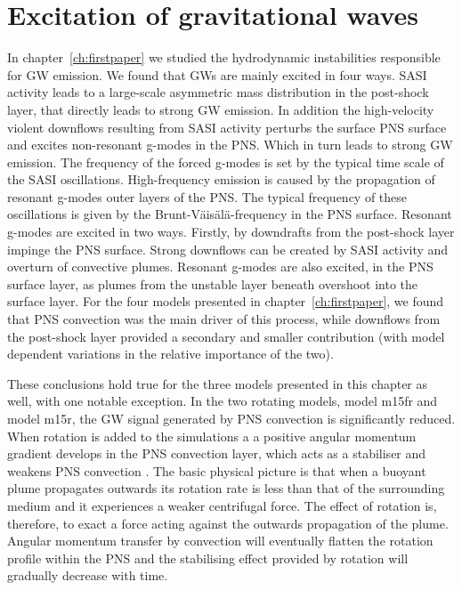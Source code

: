 \section{Excitation of gravitational waves} \label{sec:p2ext}
In chapter~\ref{ch:firstpaper} we studied the hydrodynamic instabilities responsible for GW emission.
We found that GWs are mainly excited in four ways. SASI activity leads to a large-scale asymmetric mass 
distribution in the post-shock layer, that directly leads to strong GW emission. In addition the high-velocity 
violent downflows resulting from SASI activity perturbs the surface PNS surface and excites non-resonant g-modes in the PNS.
Which in turn leads to strong GW emission. The frequency of the forced g-modes 
is set by the typical time scale of the SASI oscillations. High-frequency emission is caused by the propagation of
resonant g-modes outer layers of the PNS. The typical frequency of these oscillations is given by the
Brunt-V\"{a}is\"{a}l\"{a}-frequency in the PNS surface. Resonant g-modes are excited in two ways.
Firstly, by downdrafts from the post-shock layer impinge the PNS surface. Strong downflows can be created by SASI 
activity and overturn of convective plumes. Resonant g-modes are also excited, in the PNS surface layer,
as plumes from the unstable layer beneath overshoot into the surface layer.
For the four models presented in chapter~\ref{ch:firstpaper}, we found that PNS convection was the main driver
of this process, while downflows from the post-shock layer provided a secondary and smaller
contribution (with model dependent variations in the relative importance of the two).

These conclusions hold true for the three models presented in this chapter as well, with one notable
exception. In the two rotating models, model m15fr and model m15r, the GW signal generated by PNS 
convection is significantly reduced. When rotation is added to the simulations a a positive
angular momentum gradient develops in the PNS convection layer, which acts as a stabiliser and weakens PNS
convection \citep{janka_01b}. 
The basic physical picture is that when a buoyant plume propagates outwards its rotation rate
is less than that of the surrounding medium and it experiences a weaker centrifugal force.
The effect of rotation is, therefore, to exact a force acting against the outwards propagation of the plume.
Angular momentum transfer by convection will eventually flatten the rotation profile within the PNS and 
the stabilising effect provided by rotation will gradually decrease with time.

